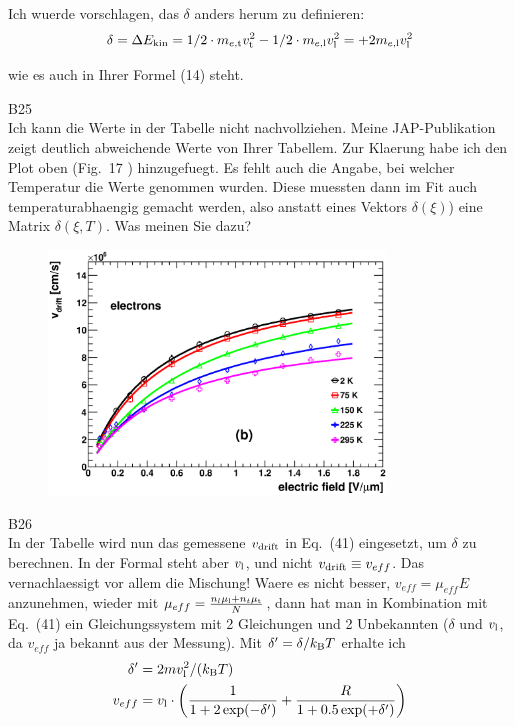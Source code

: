 \noindent
Ich wuerde vorschlagen, das $\delta$ anders herum zu definieren:
\begin{equation}
 \delta = \Delta E_{\textrm{kin}} = 1/2 \cdot m_{\mathnormal{e},\textrm{t}} v_{\textrm{t}}^2 - 1/2 \cdot m_{\mathnormal{e},\textrm{l}} v_{\textrm{l}}^2  = + 2m_{\mathnormal{e},\textrm{l}} v_{\textrm{l}}^2
\end{equation}

\noindent
wie es auch in Ihrer Formel (14) steht. 

B25\\
Ich kann die Werte in der Tabelle nicht nachvollziehen.
Meine JAP-Publikation zeigt deutlich abweichende Werte von Ihrer Tabellem. 
Zur Klaerung habe ich den Plot oben (Fig.\ 17 ) hinzugefuegt. 
Es fehlt auch die Angabe, bei welcher Temperatur die Werte genommen wurden. 
Diese muessten dann im Fit auch temperaturabhaengig gemacht werden, also anstatt eines Vektors $\delta(\xi)$) eine Matrix $\delta(\xi,T)$. 
Was meinen Sie dazu?

\begin{figure}[tb]
 \centering
 \includegraphics[trim=0 0 0 0, width=0.8\textwidth]{figures/MOBfitelecs.eps}
 \caption{}
\end{figure} 



B26\\
In der Tabelle wird nun das gemessene $v_{\textrm{drift}}$ in Eq.\ (41) eingesetzt, um $\delta$ zu berechnen. 
In der Formal steht aber $v_{\textrm{l}}$, und nicht $v_{\textrm{drift}} \equiv v_{eff}$.
Das vernachlaessigt vor allem die Mischung!
Waere es nicht besser, $v_{eff} = \mu_{eff}E$ anzunehmen, wieder mit $\mu_{eff} = \frac{n_l \mu_{\textrm{l}} + n_t \mu_{\textrm{t}}}{N}$,
 dann hat man in Kombination mit Eq.\ (41) ein Gleichungssystem mit 2 Gleichungen und 2 Unbekannten ($\delta$ und $v_{\textrm{l}}$, da $v_{eff}$ ja bekannt aus der Messung).
Mit $\delta' = \delta / k_{\textrm{B}} T$ erhalte ich
\begin{align}
 \delta' &= 2 m v_{\textrm{l}}^2 / (k_{\textrm{B}} T) \\
 v_{eff} &= v_{\textrm{l}} \cdot \left( \frac{1}{1+ 2\exp(-\delta')} + \frac{R}{1 + 0.5 \exp(+\delta')}\right)
\end{align}

